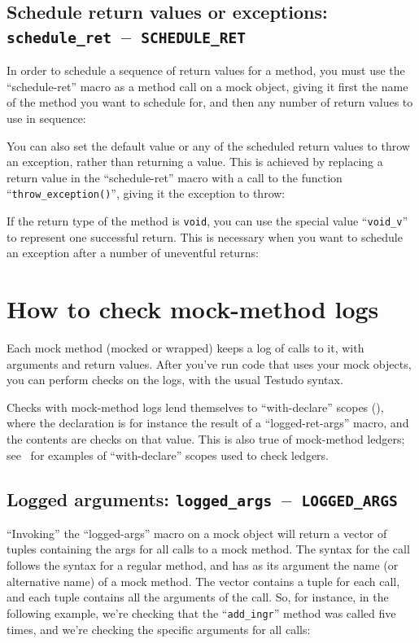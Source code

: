 \documentclass[twoside, a4paper, article]{memoir}
\newcommand*\testudocolor{\color{red!80!blue}}
\newcommand*\testudo[1]{\texttt{\testudocolor{}#1}}
\newcommand*\testudopair[2]{\testudo{#1}~--~\testudo{#2}}
\newcommand\subsectiontestudopair[3]{%
  \subsection[#1]{#1: \testudopair{#2}{#3}}}
\providecommand\typesetexample[1]{%
}
\begin{document}
\subsectiontestudopair{Schedule return values or exceptions}%
  {schedule\_ret}{SCHEDULE\_RET}

In order to schedule a sequence of return values for a method, you must use the
``schedule-ret'' macro as a method call on a mock object, giving it first the
name of the method you want to schedule for, and then any number of return
values to use in sequence:

\typesetexample{mock-class-mock-method-schedule-ret}

You can also set the default value or any of the scheduled return values to
throw an exception, rather than returning a value.  This is achieved by
replacing a return value in the ``schedule-ret'' macro with a call to the
function ``\texttt{throw\_exception()}'', giving it the exception to throw:

\typesetexample{mock-class-mock-method-schedule-exception}

If the return type of the method is \texttt{void}, you can use the special
value ``\texttt{void\_v}'' to represent one successful return.  This is
necessary when you want to schedule an exception after a number of uneventful
returns:

\typesetexample{mock-class-mock-method-schedule-exception-after-void}

\section{How to check mock-method logs}
\label{sec:check-mock-method-logs}

Each mock method (mocked or wrapped) keeps a log of calls to it, with arguments
and return values.  After you've run code that uses your mock objects, you can
perform checks on the logs, with the usual Testudo syntax.

Checks with mock-method logs lend themselves to ``with-declare'' scopes
(), where the declaration is for instance the
result of a ``logged-ret-args'' macro, and the contents are checks on that
value.  This is also true of mock-method ledgers; see~
for examples of ``with-declare'' scopes used to check ledgers.

\subsectiontestudopair{Logged arguments}{logged\_args}{LOGGED\_ARGS}

``Invoking'' the ``logged-args'' macro on a mock object will return a vector of
tuples containing the args for all calls to a mock method.  The syntax for the
call follows the syntax for a regular method, and has as its argument the name
(or alternative name) of a mock method.  The vector contains a tuple for each
call, and each tuple contains all the arguments of the call.  So, for instance,
in the following example, we're checking that the ``\texttt{add\_ingr}'' method
was called five times, and we're checking the specific arguments for all calls:
\end{document}
